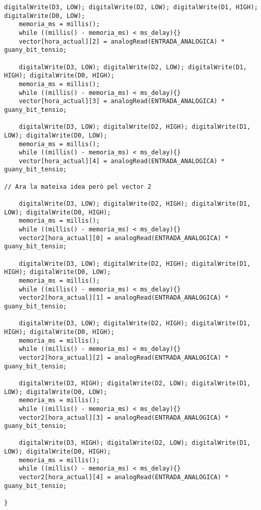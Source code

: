 \begin{lstlisting}[style=myArduino]
    digitalWrite(D3, LOW); digitalWrite(D2, LOW); digitalWrite(D1, HIGH); digitalWrite(D0, LOW);
    memoria_ms = millis();
    while ((millis() - memoria_ms) < ms_delay){}
    vector[hora_actual][2] = analogRead(ENTRADA_ANALOGICA) * guany_bit_tensio;

    digitalWrite(D3, LOW); digitalWrite(D2, LOW); digitalWrite(D1, HIGH); digitalWrite(D0, HIGH);
    memoria_ms = millis();
    while ((millis() - memoria_ms) < ms_delay){}
    vector[hora_actual][3] = analogRead(ENTRADA_ANALOGICA) * guany_bit_tensio;

    digitalWrite(D3, LOW); digitalWrite(D2, HIGH); digitalWrite(D1, LOW); digitalWrite(D0, LOW);
    memoria_ms = millis();
    while ((millis() - memoria_ms) < ms_delay){}
    vector[hora_actual][4] = analogRead(ENTRADA_ANALOGICA) * guany_bit_tensio;

// Ara la mateixa idea però pel vector 2

    digitalWrite(D3, LOW); digitalWrite(D2, HIGH); digitalWrite(D1, LOW); digitalWrite(D0, HIGH);
    memoria_ms = millis();
    while ((millis() - memoria_ms) < ms_delay){}
    vector2[hora_actual][0] = analogRead(ENTRADA_ANALOGICA) * guany_bit_tensio;

    digitalWrite(D3, LOW); digitalWrite(D2, HIGH); digitalWrite(D1, HIGH); digitalWrite(D0, LOW);
    memoria_ms = millis();
    while ((millis() - memoria_ms) < ms_delay){}
    vector2[hora_actual][1] = analogRead(ENTRADA_ANALOGICA) * guany_bit_tensio;

    digitalWrite(D3, LOW); digitalWrite(D2, HIGH); digitalWrite(D1, HIGH); digitalWrite(D0, HIGH);
    memoria_ms = millis();
    while ((millis() - memoria_ms) < ms_delay){}
    vector2[hora_actual][2] = analogRead(ENTRADA_ANALOGICA) * guany_bit_tensio;

    digitalWrite(D3, HIGH); digitalWrite(D2, LOW); digitalWrite(D1, LOW); digitalWrite(D0, LOW);
    memoria_ms = millis();
    while ((millis() - memoria_ms) < ms_delay){}
    vector2[hora_actual][3] = analogRead(ENTRADA_ANALOGICA) * guany_bit_tensio;

    digitalWrite(D3, HIGH); digitalWrite(D2, LOW); digitalWrite(D1, LOW); digitalWrite(D0, HIGH);
    memoria_ms = millis();
    while ((millis() - memoria_ms) < ms_delay){}
    vector2[hora_actual][4] = analogRead(ENTRADA_ANALOGICA) * guany_bit_tensio;
  
}

\end{lstlisting}




